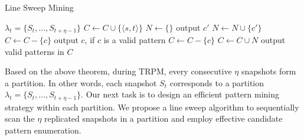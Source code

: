 \begin{algorithm}[h]
\caption{Line Sweep Mining}
\label{algo:line-sweep}
\begin{algorithmic}[1]
\Require $\lambda_t = \{S_t, ..., S_{t+\eta-1}\}$
  \label{code:ls-can-set}
\label{code:ls-init-start}
\State $C\leftarrow C\cup \{\langle s, t \rangle \}$
\EndIf
\EndFor
\label{code:ls-init-end}
 \label{code:ls-sweep-starts}
	\State $N \gets \{\}$
	 \label{code:ls-join-start}
		 \label{code:ls-join}
			\State output $c'$
			\State $N\leftarrow N\cup \{c'\}$ \label{code:ls-m-prun}	
		\EndIf
	\EndFor \label{code:ls-join-ends}
		\label{code:ls-g-prune-starts}
			\State $C\leftarrow C-\{c\}$ 
			\State output $c$, if $c$ is a valid pattern
		\EndIf  \label{code:ls-g-prune-ends}
		\label{code:ls-l-prune-starts}
			\State $C\leftarrow C-\{c\}$ 
		\EndIf\label{code:ls-l-prune-ends}
	\EndFor
	\State $C\leftarrow C\cup N$
\EndFor\label{code:ls-sweep-ends}
\State output valid patterns in  $C$  \label{code:ls-valid-check}
\end{algorithmic}
\end{algorithm}



Based on the above theorem, during TRPM, every consecutive $\eta$ snapshots
form a partition. In other words, each snapshot $S_t$ corresponds to a partition $\lambda_t=\{S_t,...,S_{t+\eta-1}\}$. Our next task is to design an efficient pattern mining strategy within each partition. We propose a line sweep algorithm to sequentially scan the $\eta$ replicated snapshots in a partition and employ effective candidate pattern enumeration.  

